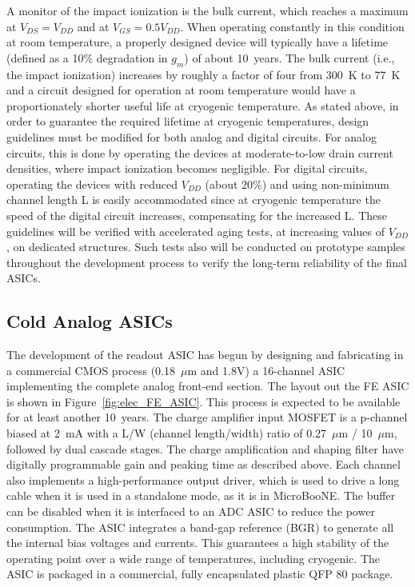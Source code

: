 A monitor of the impact ionization is the bulk current, which reaches a maximum at $V_{DS} = V_{DD}$ and at $V_{GS} = 0.5 V_{DD}$. 
When operating constantly in this condition at room temperature, a properly designed device 
will typically have a lifetime (defined as a 10\% degradation in $g_m$) of about 10~years. 
The bulk current (i.e., the impact ionization) increases by roughly a factor of four from 300~K to 77~K 
\cite{CMOS-reliability} and a circuit designed for operation at room temperature would have 
a proportionately shorter useful life at cryogenic temperature. As stated above, in order to guarantee 
the required lifetime at cryogenic temperatures, design guidelines must be modified for both analog 
and digital circuits. For analog circuits, this is done by operating the devices at moderate-to-low 
drain current densities, where impact ionization becomes negligible. 
%
For digital circuits, 
operating the devices with reduced $V_{DD}$ (about 20\%) and using non-minimum channel length L
is easily accommodated since at cryogenic temperature the speed of the digital circuit increases, 
compensating for the increased L. 
%
These guidelines will be verified with accelerated aging tests, 
at increasing values of $V_{DD}$, on dedicated structures. Such tests also will be conducted on 
prototype samples throughout the development process to verify the long-term reliability of the final ASICs.

%
\subsection{Cold Analog ASICs}
\label{subsec:fe_CMOS_analog}

The development of the readout ASIC has begun by designing and fabricating in a commercial CMOS
process (0.18~$\mu$m and 1.8V) a 16-channel ASIC implementing the complete analog front-end section.
The layout out the FE ASIC is shown in Figure~\ref{fig:elec_FE_ASIC}.
This process is expected to be available for at least another 10~years. 
The charge amplifier input MOSFET is a p-channel biased at 2~mA with a L/W (channel length/width) ratio
of 0.27~$\mu$m / 10~$\mu$m, followed by dual cascade stages.
The charge amplification and shaping filter have
digitally programmable gain and peaking time as described above. 
Each channel also implements a high-performance output driver,
which is used to drive a long cable when it is used in a standalone mode, as it is in MicroBooNE. 
The buffer can be disabled when it is interfaced to an ADC ASIC to reduce the power consumption.
The ASIC integrates a band-gap reference (BGR) to generate all the internal bias voltages and currents.
This guarantees a high stability of the operating point over a wide range of
temperatures, including cryogenic.
The ASIC is packaged in a commercial, fully encapsulated plastic QFP 80 package.

